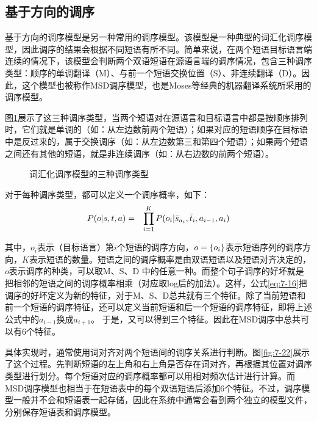 
\subsection{基于方向的调序}

\parinterval 基于方向的调序模型是另一种常用的调序模型。该模型是一种典型的词汇化调序模型，因此调序的结果会根据不同短语有所不同。简单来说，在两个短语目标语言端连续的情况下，该模型会判断两个双语短语在源语言端的调序情况，包含三种调序类型：顺序的单调翻译（M）、与前一个短语交换位置（S）、非连续翻译（D）。因此，这个模型也被称作MSD调序模型，也是Moses等经典的机器翻译系统所采用的调序模型。

\parinterval 图\ref{fig:7-21}展示了这三种调序类型，当两个短语对在源语言和目标语言中都是按顺序排列时，它们就是单调的（如：从左边数前两个短语）；如果对应的短语顺序在目标语中是反过来的，属于交换调序（如：从左边数第三和第四个短语）；如果两个短语之间还有其他的短语，就是非连续调序（如：从右边数的前两个短语）。

\begin{figure}[htp]
\centering

\caption{词汇化调序模型的三种调序类型}
\label{fig:7-21}
\end{figure}

\parinterval 对于每种调序类型，都可以定义一个调序概率，如下：
\begin{eqnarray}
{P}({o}|{s},{t},{a}) & = & \prod_{i=1}^{K} {P}(o_i| \bar{s}_{a_i}, \bar{t}_i, a_{i-1}, a_i)
\label{eq:7-16}
\end{eqnarray}

\noindent 其中，$o_i$表示（目标语言）第$i$个短语的调序方向，${o}=\{o_i\}$表示短语序列的调序方向，$K$表示短语的数量。短语之间的调序概率是由双语短语以及短语对齐决定的，$o$表示调序的种类，可以取M、S、D 中的任意一种。而整个句子调序的好坏就是把相邻的短语之间的调序概率相乘（对应取log后的加法）。这样，公式\eqref{eq:7-16}把调序的好坏定义为新的特征，对于M、S、D总共就有三个特征。除了当前短语和前一个短语的调序特征，还可以定义当前短语和后一个短语的调序特征，即将上述公式中的$a_{i-1}$换成$a_{i+1}$。 于是，又可以得到三个特征。因此在MSD调序中总共可以有6个特征。

\parinterval 具体实现时，通常使用词对齐对两个短语间的调序关系进行判断。图\ref{fig:7-22}展示了这个过程。先判断短语的左上角和右上角是否存在词对齐，再根据其位置对调序类型进行划分。每个短语对应的调序概率都可以用相对频次估计进行计算。而MSD调序模型也相当于在短语表中的每个双语短语后添加6个特征。不过，调序模型一般并不会和短语表一起存储，因此在系统中通常会看到两个独立的模型文件，分别保存短语表和调序模型。

